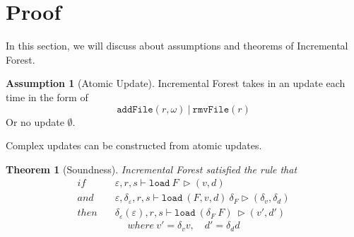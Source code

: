 \documentclass[10pt,twoside,a4paper]{article}
\theoremstyle{theorem}
\newtheorem{theorem}{Theorem}[section]
\theoremstyle{lemma}
\theoremstyle{property}
\theoremstyle{definition}
\theoremstyle{assumption}
\newtheorem{assumption}{Assumption}[section]
\def\snd{\pi_2}
\def\newenv{\delta_\varepsilon(\varepsilon)}
\begin{document}
\begin{comment}
\begin{displaymath}
	\frac{\begin{array}{c}
	\forall n \in \llbracket e \rrbracket^{\varepsilon_{new}}_{\{Path\}} \cap \llbracket e \rrbracket^{\varepsilon_{old}}_{\{Path\}}, ~ v = vs(n), ~d = ds(n)\\
	(\delta_\varepsilon, r \mapsto (r/n, \emptyset)), s \vdash \mathtt{load}_\Delta (F,v,d)~ u \rhd (\delta_v,\delta_d)
	\end{array}}
	{\mathtt{changeVOf}(n) = \mathtt{mod}((n,v), \snd\delta_v), ~~\mathtt{changeDOf}(n) = \mathtt{mod}((n,d), \snd\delta_d)}
\end{displaymath}
If the filename $n$ is preserved in both environments, Incremental Forest delta-load the file recursively. One thing to notice here is that we append the name $n$ directly to the filepath $r$. Because in either old or new environment, the expression $e$ can always be evaluated to this $r/n$ filepath, in this level of recursion, we don't need to record the change in filepath. This makes the delta environment clear of unexpected change on variables.
\end{comment}

\newpage
\section{Proof}
In this section, we will discuss about assumptions and theorems of Incremental Forest.
\begin{assumption}[Atomic Update]
	Incremental Forest takes in an update each time in the form of 
	\begin{displaymath}
		\mathtt{addFile}(r,\omega) ~|~ \mathtt{rmvFile}(r)%
	\end{displaymath}
	Or no update $\emptyset$.
\end{assumption}

Complex updates can be constructed from atomic updates.

\begin{comment}
\begin{assumption}[Filesystem is a tree]
	Incremental Forest views symbolic link as a normal file. \\
	not necessarily needed.
\end{assumption}
\end{comment}

\begin{theorem}[Soundness]
	Incremental Forest satisfied the rule that
	\begin{align*}
		if   \quad & \varepsilon, r, s \vdash \mathtt{load}~ F~ \rhd (v,d)\\
		and  \quad & \varepsilon, \delta_\varepsilon, r, s \vdash \mathtt{load}~ (F,v,d)~ \delta_F \rhd (\delta_v,\delta_d)\\
		then \quad & \newenv, r, s \vdash \mathtt{load}~ (\delta_F~F)~ \rhd (v',d')
	\end{align*}
	\begin{displaymath}
		where ~v' = \delta_v v, \quad d' = \delta_d d
	\end{displaymath}
\end{theorem}
\end{document}
